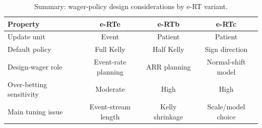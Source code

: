 \begin{table}[htbp]
\centering
\small
\caption{Summary: wager-policy design considerations by e-RT variant.}
\begin{tabular}{@{}lccc@{}}
\toprule
Property & e-RTe & e-RTb & e-RTc \\
\midrule
Update unit & Event & Patient & Patient \\
Default policy & Full Kelly & Half Kelly & Sign direction \\
Design-wager role & Event-rate planning & ARR planning & Normal-shift model \\
Over-betting sensitivity & Moderate & High & High \\
Main tuning issue & Event-stream length & Kelly shrinkage & Scale/model choice \\
\bottomrule
\end{tabular}
\label{tab:wage_summary}
\end{table}
